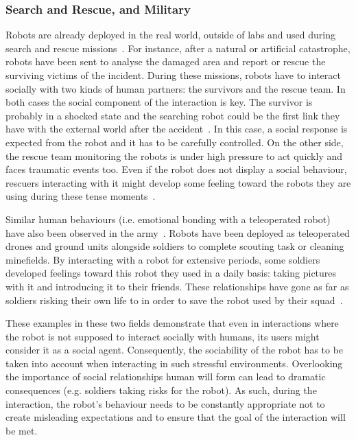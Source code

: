 \subsubsection{Search and Rescue, and Military} 
    Robots are already deployed in the real world, outside of labs and used during search and rescue missions~\citep{casper2003human,murphy2004human}. For instance, after a natural or artificial catastrophe, robots have been sent to analyse the damaged area and report or rescue the surviving victims of the incident. During these missions, robots have to interact socially with two kinds of human partners: the survivors and the rescue team. In both cases the social component of the interaction is key. The survivor is probably in a shocked state and the searching robot could be the first link they have with the external world after the accident~\citep{murphy2008search}. In this case, a social response is expected from the robot and it has to be carefully controlled. On the other side, the rescue team monitoring the robots is under high pressure to act quickly and faces traumatic events too. Even if the robot does not display a social behaviour, rescuers interacting with it might develop some feeling toward the robots they are using during these tense moments~\citep{fincannon2004evidence}.
	
    Similar human behaviours (i.e. emotional bonding with a teleoperated robot) have also been observed in the army~\citep{singer2009wired}. Robots have been deployed as teleoperated drones and ground units alongside soldiers to complete scouting task or cleaning minefields. By interacting with a robot for extensive periods, some soldiers developed feelings toward this robot they used in a daily basis: taking pictures with it and introducing it to their friends. These relationships have gone as far as soldiers risking their own life to in order to save the robot used by their squad~\citep{singer2009wired}. 
    
    These examples in these two fields demonstrate that even in interactions where the robot is not supposed to interact socially with humans, its users might consider it as a social agent. Consequently, the sociability of the robot has to be taken into account when interacting in such stressful environments. Overlooking the importance of social relationships human will form can lead to dramatic consequences (e.g. soldiers taking risks for the robot). As such, during the interaction, the robot's behaviour needs to be constantly appropriate not to create misleading expectations and to ensure that the goal of the interaction will be met.
		
